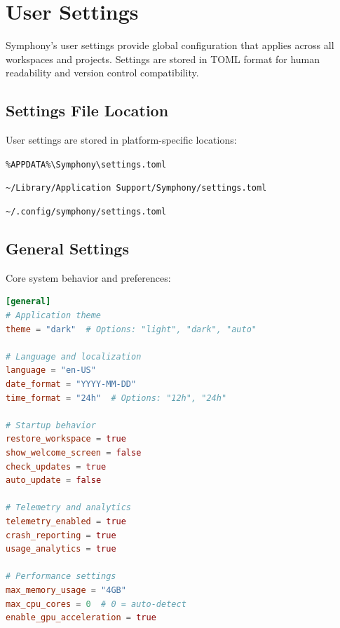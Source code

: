 \section*{User Settings}

Symphony's user settings provide global configuration that applies across all workspaces and projects. Settings are stored in TOML format for human readability and version control compatibility.

\subsection*{Settings File Location}

User settings are stored in platform-specific locations:

\begin{description}[leftmargin=4cm,labelwidth=3.5cm]
\item[\textbf{Windows}] \texttt{\%APPDATA\%\textbackslash Symphony\textbackslash settings.toml}
\item[\textbf{macOS}] \texttt{\textasciitilde/Library/Application Support/Symphony/settings.toml}
\item[\textbf{Linux}] \texttt{\textasciitilde/.config/symphony/settings.toml}
\end{description}

\subsection*{General Settings}

Core system behavior and preferences:

\begin{lstlisting}[language=toml,caption={General Settings Configuration}]
[general]
# Application theme
theme = "dark"  # Options: "light", "dark", "auto"

# Language and localization
language = "en-US"
date_format = "YYYY-MM-DD"
time_format = "24h"  # Options: "12h", "24h"

# Startup behavior
restore_workspace = true
show_welcome_screen = false
check_updates = true
auto_update = false

# Telemetry and analytics
telemetry_enabled = true
crash_reporting = true
usage_analytics = true

# Performance settings
max_memory_usage = "4GB"
max_cpu_cores = 0  # 0 = auto-detect
enable_gpu_acceleration = true
\end{lstlisting}

